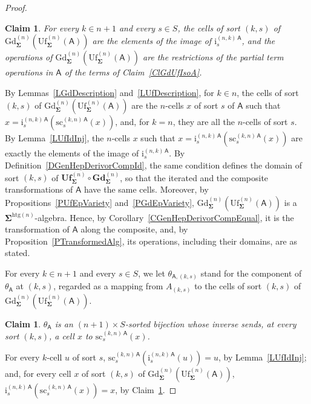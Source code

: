 \documentclass[a4paper, reqno]{amsbook}
\newcommand{\sig}[1]{\mathbf{#1}}             %
\newcommand{\calg}[1]{\boldsymbol{\mathsf{#1}}} %
\newcommand{\htg}{\mathrm{htg}}                %
\newcommand{\src}{\mathrm{sc}}
\newcommand{\Gd}{\mathrm{Gd}}
\newcommand{\Uf}{\mathrm{Uf}}
\newcommand{\bGd}{\mathbf{Gd}}
\newcommand{\bUf}{\mathbf{Uf}}
\theoremstyle{plain}
\newtheorem{claim}[theorem]{Claim}
\theoremstyle{definition}
\begin{document}
\begin{proof}
\begin{claim}\label{ClGdUfIsoB}
For every $k\in n+1$ and every $s\in S$, the cells of sort $(k,s)$ of $\Gd^{(n)}_{\sig{\Sigma}}(\Uf^{(n)}_{\sig{\Sigma}}(\calg{A}))$ are the elements of the image of $\mathrm{i}^{(n,k)\,\calg{A}}_s$, and the operations of $\Gd^{(n)}_{\sig{\Sigma}}(\Uf^{(n)}_{\sig{\Sigma}}(\calg{A}))$ are the restrictions of the partial term operations in $\calg{A}$ of the terms of Claim~\ref{ClGdUfIsoA}.
\end{claim}
By Lemmas~\ref{LGdDescription} and~\ref{LUfDescription}, for $k\in n$, the cells of sort $(k,s)$ of $\Gd^{(n)}_{\sig{\Sigma}}(\Uf^{(n)}_{\sig{\Sigma}}(\calg{A}))$ are the $n$-cells $x$ of sort $s$ of $\calg{A}$ such that $x=\mathrm{i}^{(n,k)\,\calg{A}}_s(\src^{(k,n)\,\calg{A}}_s(x))$, and, for $k=n$, they are all the $n$-cells of sort $s$.
By Lemma~\ref{LUfIdInj}, the $n$-cells $x$ such that $x=\mathrm{i}^{(n,k)\,\calg{A}}_s(\src^{(k,n)\,\calg{A}}_s(x))$ are exactly the elements of the image of $\mathrm{i}^{(n,k)\,\calg{A}}_s$.
By Definition~\ref{DGenHepDerivorCompId}, the same condition defines the domain of sort $(k,s)$ of $\bUf^{(n)}_{\sig{\Sigma}}\circ\bGd^{(n)}_{\sig{\Sigma}}$, so that the iterated and the composite transformations of $\calg{A}$ have the same cells.
Moreover, by Propositions~\ref{PUfEpVariety} and~\ref{PGdEpVariety}, $\Gd^{(n)}_{\sig{\Sigma}}(\Uf^{(n)}_{\sig{\Sigma}}(\calg{A}))$ is a $\sig{\Sigma}^{\htg(n)}$-algebra.
Hence, by Corollary~\ref{CGenHepDerivorCompEqual}, it is the transformation of $\calg{A}$ along the composite, and, by Proposition~\ref{PTransformedAlg}, its operations, including their domains, are as stated.

For every $k\in n+1$ and every $s\in S$, we let $\theta_{\calg{A},(k,s)}$ stand for the component of $\theta_{\calg{A}}$ at $(k,s)$, regarded as a mapping from $A_{(k,s)}$ to the cells of sort $(k,s)$ of $\Gd^{(n)}_{\sig{\Sigma}}(\Uf^{(n)}_{\sig{\Sigma}}(\calg{A}))$.

\begin{claim}\label{ClGdUfIsoC}
$\theta_{\calg{A}}$ is an $(n+1)\times S$-sorted bijection whose inverse sends, at every sort $(k,s)$, a cell $x$ to $\src^{(k,n)\,\calg{A}}_s(x)$.
\end{claim}
For every $k$-cell $u$ of sort $s$, $\src^{(k,n)\,\calg{A}}_s(\mathrm{i}^{(n,k)\,\calg{A}}_s(u))=u$, by Lemma~\ref{LUfIdInj}; and, for every cell $x$ of sort $(k,s)$ of $\Gd^{(n)}_{\sig{\Sigma}}(\Uf^{(n)}_{\sig{\Sigma}}(\calg{A}))$, $\mathrm{i}^{(n,k)\,\calg{A}}_s(\src^{(k,n)\,\calg{A}}_s(x))=x$, by Claim~\ref{ClGdUfIsoB}.


\end{proof}
\end{document}
